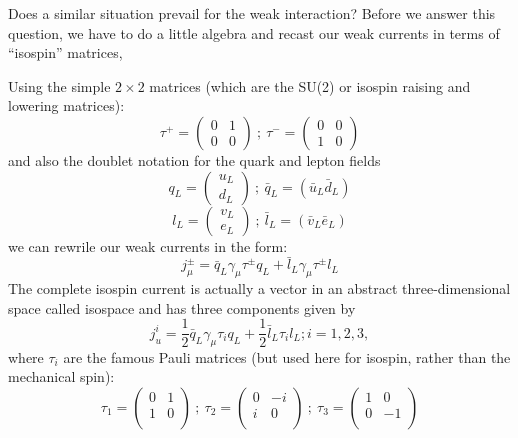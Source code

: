 Does a similar situation prevail for the weak interaction? Before we answer this question, we
have to do a little algebra and recast our weak currents in terms of “isospin” matrices, 

Using the simple $2 \times 2$ matrices (which are the SU(2) or isospin raising and lowering matrices): 
\begin{equation*}
\tau^{+} = 
\begin{pmatrix}
0 & 1\\
0 & 0
\end{pmatrix}
~;~\tau^{-} = 
\begin{pmatrix}
0 & 0\\
1 & 0
\end{pmatrix}\tag{3.9}
\end{equation*}
and also the doublet notation for the quark and lepton fields 
\begin{equation*}
q_{L}= \begin{pmatrix}
u_{L}\\
d_{L}
\end{pmatrix}~;~
\bar{q}_{L} = (\bar{u}_{L} \bar{d}_{L})\tag{3.10}
\end{equation*}
\begin{equation*}
l_{L}= \begin{pmatrix}
v_{L}\\
e_{L}
\end{pmatrix}~;~
\bar{l}_{L} = (\bar{v}_{L} \bar{e}_{L})\tag{3.11}
\end{equation*}
we can rewrile our weak currents in the form: 
\begin{equation*}
j^{\pm}_{\mu} = \bar{q}_{L}\gamma_{\mu}\tau^{\pm}q_{L} + \bar{l}_{L}\gamma_{\mu}\tau^{\pm}l_{L}\tag{3.12}
\end{equation*}
The complete isospin current is actually a vector in an abstract three-dimensional space called isospace and has three components given by 
\begin{equation*}
j^{i}_{u} = \frac{1}{2} \bar{q}_{L}\gamma_{\mu}\tau_{i}q_{L} + \frac{1}{2}\bar{l}_{L}\tau_{i}l_{L}; i=1,2,3, \tag{3.13}
\end{equation*}
where $\tau_{i}$ are the famous Pauli matrices (but used here for isospin, rather than the mechanical spin): 
\begin{equation*}
\tau_{1}=
\begin{pmatrix}
0 & 1\\
1 & 0\\
\end{pmatrix}~;~
\tau_{2} = 
\begin{pmatrix}
0 & -i\\
i & 0\\
\end{pmatrix}~;~
\tau_{3} = 
\begin{pmatrix}
1 & 0\\
0 & -1\\
\end{pmatrix}\tag{3.14}
\end{equation*}

